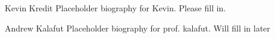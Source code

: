 \documentclass{IEEEtran}
\begin{document}





\begin{IEEEbiography}{Kevin Kredit}
  Placeholder biography for Kevin. Please fill in.
\end{IEEEbiography}

\begin{IEEEbiography}{Andrew Kalafut}
  Placeholder biography for prof. kalafut. Will fill in later 
\end{IEEEbiography}
\end{document}
